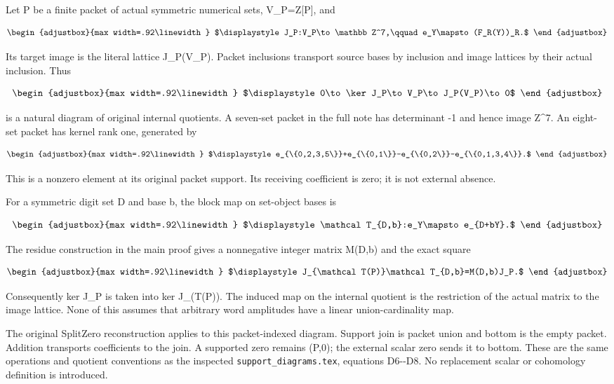 Let P be a finite packet of actual symmetric numerical sets, V\_P=Z{[}P{]}, and

\[
\begin{adjustbox}{max width=.92\linewidth}
$\displaystyle J_P:V_P\to\mathbb Z^7,\qquad e_Y\mapsto(F_R(Y))_R.$
\end{adjustbox}
\]

Its target image is the literal lattice J\_P(V\_P). Packet inclusions transport source bases by inclusion and image lattices by their actual inclusion. Thus

\[
\begin{adjustbox}{max width=.92\linewidth}
$\displaystyle 0\to\ker J_P\to V_P\to J_P(V_P)\to0$
\end{adjustbox}
\]

is a natural diagram of original internal quotients. A seven-set packet in the full note has determinant -1 and hence image Z\^{}7. An eight-set packet has kernel rank one, generated by

\[
\begin{adjustbox}{max width=.92\linewidth}
$\displaystyle e_{\{0,2,3,5\}}+e_{\{0,1\}}-e_{\{0,2\}}-e_{\{0,1,3,4\}}.$
\end{adjustbox}
\]

This is a nonzero element at its original packet support. Its receiving coefficient is zero; it is not external absence.

For a symmetric digit set D and base b, the block map on set-object bases is

\[
\begin{adjustbox}{max width=.92\linewidth}
$\displaystyle \mathcal T_{D,b}:e_Y\mapsto e_{D+bY}.$
\end{adjustbox}
\]

The residue construction in the main proof gives a nonnegative integer matrix M(D,b) and the exact square

\[
\begin{adjustbox}{max width=.92\linewidth}
$\displaystyle J_{\mathcal T(P)}\mathcal T_{D,b}=M(D,b)J_P.$
\end{adjustbox}
\]

Consequently ker J\_P is taken into ker J\_(T(P)). The induced map on the internal quotient is the restriction of the actual matrix to the image lattice. None of this assumes that arbitrary word amplitudes have a linear union-cardinality map.

The original SplitZero reconstruction applies to this packet-indexed diagram. Support join is packet union and bottom is the empty packet. Addition transports coefficients to the join. A supported zero remains (P,0); the external scalar zero sends it to bottom. These are the same operations and quotient conventions as the inspected \texttt{support\_diagrams.tex}, equations D6-\/-D8. No replacement scalar or cohomology definition is introduced.

